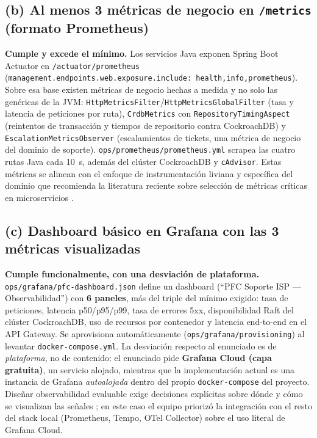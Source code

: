 \documentclass[11pt,letterpaper]{article}
\begin{document}
\subsection{(b) Al menos 3 métricas de negocio en \texttt{/metrics} (formato Prometheus)}
\textbf{Cumple y excede el mínimo.} Los servicios Java exponen Spring Boot Actuator en \texttt{/actuator/prometheus} (\texttt{management.endpoints.web.exposure.include: health,info,prometheus}). Sobre esa base existen métricas de negocio hechas a medida y no solo las genéricas de la JVM: \texttt{HttpMetricsFilter}/\texttt{HttpMetricsGlobalFilter} (tasa y latencia de peticiones por ruta), \texttt{CrdbMetrics} con \texttt{RepositoryTimingAspect} (reintentos de transacción y tiempos de repositorio contra CockroachDB) y \texttt{EscalationMetricsObserver} (escalamientos de tickets, una métrica de negocio del dominio de soporte). \texttt{ops/prometheus/prometheus.yml} scrapea las cuatro rutas Java cada 10~s, además del clúster CockroachDB y \texttt{cAdvisor}. Estas métricas se alinean con el enfoque de instrumentación liviana y específica del dominio que recomienda la literatura reciente sobre selección de métricas críticas en microservicios \cite{singal2025metric}.

\subsection{(c) Dashboard básico en Grafana con las 3 métricas visualizadas}
\textbf{Cumple funcionalmente, con una desviación de plataforma.} \texttt{ops/grafana/pfc-dashboard.json} define un dashboard (``PFC Soporte ISP --- Observabilidad'') con \textbf{6 paneles}, más del triple del mínimo exigido: tasa de peticiones, latencia p50/p95/p99, tasa de errores 5xx, disponibilidad Raft del clúster CockroachDB, uso de recursos por contenedor y latencia end-to-end en el API Gateway. Se aprovisiona automáticamente (\texttt{ops/grafana/provisioning}) al levantar \texttt{docker-compose.yml}. La desviación respecto al enunciado es de \emph{plataforma}, no de contenido: el enunciado pide \textbf{Grafana Cloud (capa gratuita)}, un servicio alojado, mientras que la implementación actual es una instancia de Grafana \emph{autoalojada} dentro del propio \texttt{docker-compose} del proyecto. Diseñar observabilidad evaluable exige decisiones explícitas sobre dónde y cómo se visualizan las señales \cite{borges2024observability}; en este caso el equipo priorizó la integración con el resto del stack local (Prometheus, Tempo, OTel Collector) sobre el uso literal de Grafana Cloud.
\end{document}
